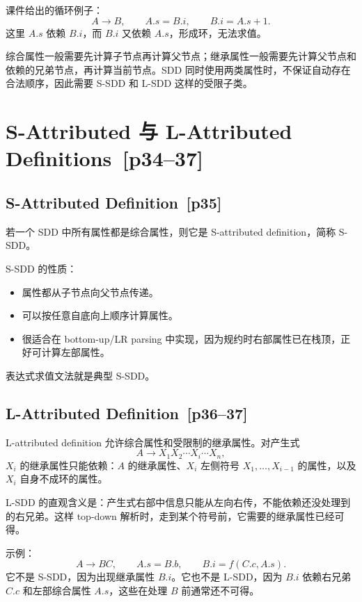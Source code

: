 \documentclass[UTF8,fontset=none,11pt]{ctexart}
\newenvironment{defbox}[1][]{%
  \par\medskip\noindent{\color{defrule}\rule{\linewidth}{1.1pt}}\par\nopagebreak
  \noindent{\bfseries\color{defrule}#1}\par\nopagebreak\smallskip}%
  {\par\nopagebreak\smallskip\noindent{\color{defrule}\rule{\linewidth}{0.4pt}}\par\medskip}
\newcommand{\pg}[1]{\texorpdfstring{{\small\color{graytext}\,[p#1]}}{ [p#1]}}
\begin{document}
课件给出的循环例子：
\[
A\to B,\qquad A.s=B.i,\qquad B.i=A.s+1.
\]
这里 \(A.s\) 依赖 \(B.i\)，而 \(B.i\) 又依赖 \(A.s\)，形成环，无法求值。

综合属性一般需要先计算子节点再计算父节点；继承属性一般需要先计算父节点和依赖的兄弟节点，再计算当前节点。SDD 同时使用两类属性时，不保证自动存在合法顺序，因此需要 S-SDD 和 L-SDD 这样的受限子类。

\section{S-Attributed 与 L-Attributed Definitions \pg{34--37}}

\subsection{S-Attributed Definition \pg{35}}

\begin{defbox}[S-SDD]
若一个 SDD 中所有属性都是综合属性，则它是 S-attributed definition，简称 S-SDD。
\end{defbox}

S-SDD 的性质：

\begin{itemize}
  \item 属性都从子节点向父节点传递。
  \item 可以按任意自底向上顺序计算属性。
  \item 很适合在 bottom-up/LR parsing 中实现，因为规约时右部属性已在栈顶，正好可计算左部属性。
\end{itemize}

表达式求值文法就是典型 S-SDD。

\subsection{L-Attributed Definition \pg{36--37}}

\begin{defbox}[L-SDD]
L-attributed definition 允许综合属性和受限制的继承属性。对产生式
\[
A\to X_1X_2\cdots X_i\cdots X_n,
\]
\(X_i\) 的继承属性只能依赖：\(A\) 的继承属性、\(X_i\) 左侧符号 \(X_1,\ldots,X_{i-1}\) 的属性，以及 \(X_i\) 自身不成环的属性。
\end{defbox}

L-SDD 的直观含义是：产生式右部中信息只能从左向右传，不能依赖还没处理到的右兄弟。这样 top-down 解析时，走到某个符号前，它需要的继承属性已经可得。

示例：
\[
A\to BC,\qquad A.s=B.b,\qquad B.i=f(C.c,A.s).
\]
它不是 S-SDD，因为出现继承属性 \(B.i\)。它也不是 L-SDD，因为 \(B.i\) 依赖右兄弟 \(C.c\) 和左部综合属性 \(A.s\)，这些在处理 \(B\) 前通常还不可得。
\end{document}
